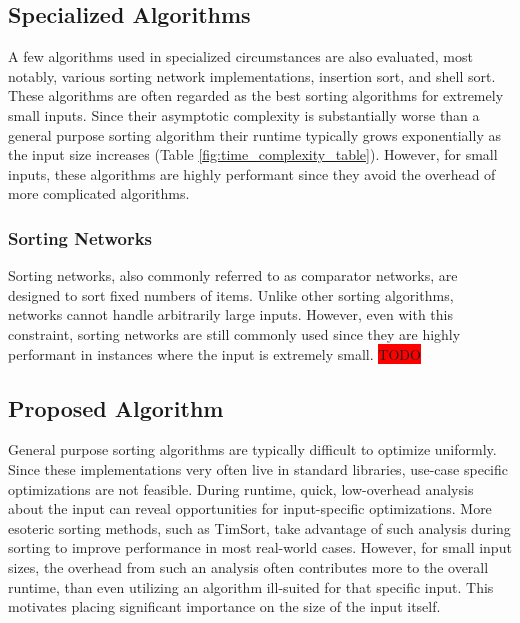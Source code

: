 \documentclass[letter, 12pt, conference]{ieeeconf}
\newcommand{\todo}{\colorbox{red}{TODO}}
\begin{document}
\subsection{Specialized Algorithms}

A few algorithms used in specialized circumstances are also evaluated, most
notably, various sorting network implementations, insertion sort, and shell
sort. These algorithms are often regarded as the best sorting algorithms for
extremely small inputs. Since their asymptotic complexity is substantially worse
than a general purpose sorting algorithm their runtime typically grows
exponentially as the input size increases (Table
\ref{fig:time_complexity_table}). However, for small inputs, these algorithms
are highly performant since they avoid the overhead of more complicated
algorithms.

\subsubsection{Sorting Networks}

Sorting networks, also commonly referred to as comparator networks, are designed
to sort fixed numbers of items. Unlike other sorting algorithms, networks cannot
handle arbitrarily large inputs. However, even with this constraint, sorting
networks are still commonly used since they are highly performant in instances
where the input is extremely small. \todo


\subsection{Proposed Algorithm}

General purpose sorting algorithms are typically difficult to optimize
uniformly. Since these implementations very often live in standard libraries,
use-case specific optimizations are not feasible. During runtime, quick,
low-overhead analysis about the input can reveal opportunities for
input-specific optimizations. More esoteric sorting methods, such as TimSort,
take advantage of such analysis during sorting to improve performance in most
real-world cases. However, for small input sizes, the overhead from such an
analysis often contributes more to the overall runtime, than even utilizing an
algorithm ill-suited for that specific input\parencite{the_basic_algorithms}.
This motivates placing significant importance on the size of the input itself.
\end{document}
